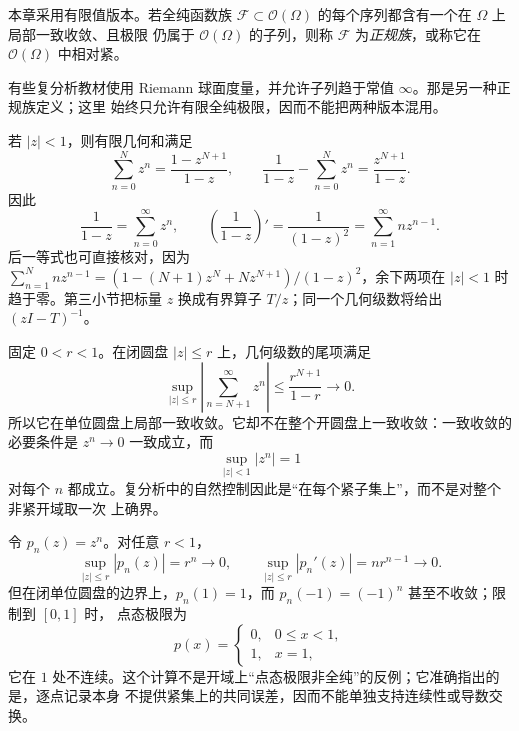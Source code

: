 \begin{definition}[正规族]\label{def:7-1-1-3}
本章采用有限值版本。若全纯函数族
$\mathcal F\subset\mathcal O(\Omega)$ 的每个序列都含有一个在 $\Omega$ 上局部一致收敛、且极限
仍属于 $\mathcal O(\Omega)$ 的子列，则称 $\mathcal F$ 为\emph{正规族}，或称它在
$\mathcal O(\Omega)$ 中相对紧。
\end{definition}

有些复分析教材使用 Riemann 球面度量，并允许子列趋于常值 $\infty$。那是另一种正规族定义；这里
始终只允许有限全纯极限，因而不能把两种版本混用。

\begin{example}[几何级数与预解式原型]\label{ex:7-1-1-1}
若 $|z|<1$，则有限几何和满足
\[
  \sum_{n=0}^{N}z^n=\frac{1-z^{N+1}}{1-z},
  \qquad
  \frac1{1-z}-\sum_{n=0}^{N}z^n=\frac{z^{N+1}}{1-z}.
\]
因此
\[
  \frac1{1-z}=\sum_{n=0}^{\infty}z^n,
  \qquad
  \left(\frac1{1-z}\right)'=\frac1{(1-z)^2}
  =\sum_{n=1}^{\infty}nz^{n-1}.
\]
后一等式也可直接核对，因为
$\sum_{n=1}^{N}nz^{n-1}=(1-(N+1)z^N+Nz^{N+1})/(1-z)^2$，余下两项在
$|z|<1$ 时趋于零。第三小节把标量 $z$ 换成有界算子 $T/z$；同一个几何级数将给出
$(zI-T)^{-1}$。
\end{example}

\begin{example}[局部一致但非全局一致]\label{ex:7-1-1-2}
固定 $0<r<1$。在闭圆盘 $|z|\le r$ 上，几何级数的尾项满足
\[
 \sup_{|z|\le r}\left|\sum_{n=N+1}^{\infty}z^n\right|
 \le\frac{r^{N+1}}{1-r}\longrightarrow0.
\]
所以它在单位圆盘上局部一致收敛。它却不在整个开圆盘上一致收敛：一致收敛的必要条件是
$z^n\to0$ 一致成立，而
\[
  \sup_{|z|<1}|z^n|=1
\]
对每个 $n$ 都成立。复分析中的自然控制因此是“在每个紧子集上”，而不是对整个非紧开域取一次
上确界。
\end{example}

\begin{example}[边界点态观测不足]\label{ex:7-1-1-3}
令 $p_n(z)=z^n$。对任意 $r<1$，
\[
  \sup_{|z|\le r}|p_n(z)|=r^n\longrightarrow0,
  \qquad
  \sup_{|z|\le r}|p_n'(z)|=nr^{n-1}\longrightarrow0.
\]
但在闭单位圆盘的边界上，$p_n(1)=1$，而 $p_n(-1)=(-1)^n$ 甚至不收敛；限制到 $[0,1]$ 时，
点态极限为
\[
  p(x)=\begin{cases}0,&0\le x<1,\\1,&x=1,
  \end{cases}
\]
它在 $1$ 处不连续。这个计算不是开域上“点态极限非全纯”的反例；它准确指出的是，逐点记录本身
不提供紧集上的共同误差，因而不能单独支持连续性或导数交换。
\end{example}

